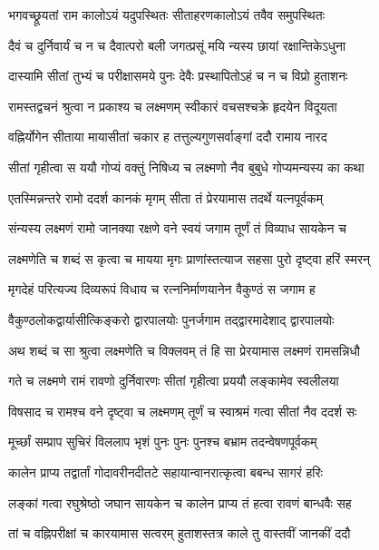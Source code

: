 \twolineshloka
{भगवच्छ्रूयतां राम कालोऽयं यदुपस्थितः}
{सीताहरणकालोऽयं तवैव समुपस्थितः} %

\twolineshloka
{दैवं च दुर्निवार्यं च न च दैवात्परो बली}
{जगत्प्रसूं मयि न्यस्य छायां रक्षान्तिकेऽधुना} %

\twolineshloka
{दास्यामि सीतां तुभ्यं च परीक्षासमये पुनः}
{देवैः प्रस्थापितोऽहं च न च विप्रो हुताशनः} %

\twolineshloka
{रामस्तद्वचनं श्रुत्वा न प्रकाश्य च लक्ष्मणम्}
{स्वीकारं वचसश्चक्रे हृदयेन विदूयता} %

\twolineshloka
{वह्निर्योगेन सीताया मायासीतां चकार ह}
{तत्तुल्यगुणसर्वाङ्‌गां ददौ रामाय नारद} %

\twolineshloka
{सीतां गृहीत्वा स ययौ गोप्यं वक्तुं निषिध्य च}
{लक्ष्मणो नैव बुबुधे गोप्यमन्यस्य का कथा} %

\twolineshloka
{एतस्मिन्नन्तरे रामो ददर्श कानकं मृगम्}
{सीता तं प्रेरयामास तदर्थे यत्‍नपूर्वकम्} %

\twolineshloka
{संन्यस्य लक्ष्मणं रामो जानक्या रक्षणे वने}
{स्वयं जगाम तूर्णं तं विव्याध सायकेन च} %

\twolineshloka
{लक्ष्मणेति च शब्दं स कृत्वा च मायया मृगः}
{प्राणांस्तत्याज सहसा पुरो दृष्ट्वा हरिं स्मरन्} %

\twolineshloka
{मृगदेहं परित्यज्य दिव्यरूपं विधाय च}
{रत्‍ननिर्माणयानेन वैकुण्ठं स जगाम ह} %

\twolineshloka
{वैकुण्ठलोकद्वार्यासीत्किङ्‌करो द्वारपालयोः}
{पुनर्जगाम तद्द्वारमादेशाद्‌ द्वारपालयोः} %

\twolineshloka
{अथ शब्दं च सा श्रुत्वा लक्ष्मणेति च विक्लवम्}
{तं हि सा प्रेरयामास लक्ष्मणं रामसन्निधौ} %

\twolineshloka
{गते च लक्ष्मणे रामं रावणो दुर्निवारणः}
{सीतां गृहीत्वा प्रययौ लङ्‌कामेव स्वलीलया} %

\twolineshloka
{विषसाद च रामश्च वने दृष्ट्वा च लक्ष्मणम्}
{तूर्णं च स्वाश्रमं गत्वा सीतां नैव ददर्श सः} %

\twolineshloka
{मूर्च्छां सम्प्राप सुचिरं विललाप भृशं पुनः}
{पुनः पुनश्च बभ्राम तदन्वेषणपूर्वकम्} %

\twolineshloka
{कालेन प्राप्य तद्वार्तां गोदावरीनदीतटे}
{सहायान्वानरात्कृत्वा बबन्ध सागरं हरिः} %

\twolineshloka
{लङ्‌कां गत्वा रघुश्रेष्ठो जघान सायकेन च}
{कालेन प्राप्य तं हत्वा रावणं बान्धवैः सह} %

\twolineshloka
{तां च वह्निपरीक्षां च कारयामास सत्वरम्}
{हुताशस्तत्र काले तु वास्तवीं जानकीं ददौ} %

